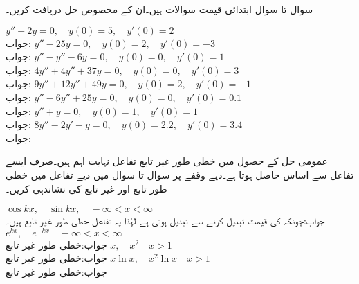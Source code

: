 سوال  تا سوال  ابتدائی قیمت سوالات ہیں۔ان کے مخصوص حل دریافت کریں۔

$y''+2y=0,\quad y(0)=5,\quad y'(0)=2$\\
جواب:
$y''-25y=0,\quad y(0)=2,\quad y'(0)=-3$\\
جواب:
$y''-y''-6y=0,\quad y(0)=0,\quad y'(0)=1$\\
جواب:
$4y''+4y''+37y=0,\quad y(0)=0,\quad y'(0)=3$\\
جواب:
$9y''+12y''+49y=0,\quad y(0)=2,\quad y'(0)=-1$\\
جواب:
$y''-6y''+25y=0,\quad y(0)=0,\quad y'(0)=0.1$\\
جواب:
$y''+y=0,\quad y(0)=1,\quad y'(0)=1$\\
جواب:
$8y''-2y'-y=0,\quad y(0)=2.2,\quad y'(0)=3.4$\\
جواب:

عمومی حل کے حصول میں خطی طور غیر تابع تفاعل نہایت اہم ہیں۔صرف ایسے تفاعل سے اساس حاصل ہوتا ہے۔دیے وقفے پر سوال  تا سوال  میں دیے تفاعل میں خطی طور تابع اور غیر تابع کی نشاندہی کریں۔ 

$\cos kx, \quad \sin kx, \quad -\infty <x<\infty$\\
جواب:چونکہ  کی قیمت  تبدیل کرنے سے تبدیل ہوتی ہے لہٰذا یہ تفاعل خطی طور غیر تابع ہیں۔
$e^{kx}, \quad e^{-kx}\quad -\infty <x<\infty$\\
جواب:خطی طور غیر تابع
$x, \quad x^2\quad x>1$\\
جواب:خطی طور غیر تابع
$x\ln x, \quad x^2 \ln x\quad x>1$\\
جواب:خطی طور غیر تابع

